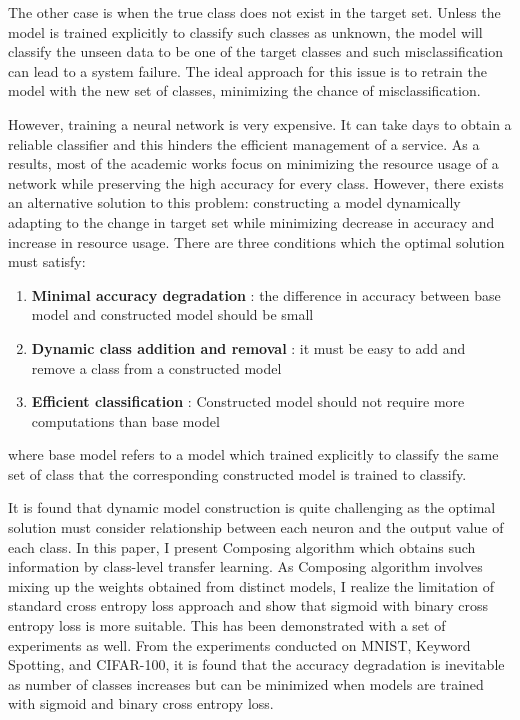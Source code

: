 \documentclass{article}
\begin{document}
The other case is when the true class does not exist in the target set. Unless the model is trained explicitly to classify such classes as unknown, the model will classify the unseen data to be one of the target classes and such misclassification can lead to a system failure. The ideal approach for this issue is to retrain the model with the new set of classes, minimizing the chance of misclassification.

However, training a neural network is very expensive. It can take days to obtain a reliable classifier and this hinders the efficient management of a service. As a results, most of the academic works focus on minimizing the resource usage of a network while preserving the high accuracy for every class. However, there exists an alternative solution to this problem: constructing a model dynamically adapting to the change in target set while minimizing decrease in accuracy and increase in resource usage. There are three conditions which the optimal solution must satisfy:

\begin{enumerate}
    \item \textbf{Minimal accuracy degradation} : the difference in accuracy between base model and constructed model should be small
    \item \textbf{Dynamic class addition and removal} : it must be easy to add and remove a class from a constructed model
    \item \textbf{Efficient classification} : Constructed model should not require more computations than base model
\end{enumerate}

where base model refers to a model which trained explicitly to classify the same set of class that the corresponding constructed model is trained to classify.

It is found that dynamic model construction is quite challenging as the optimal solution must consider relationship between each neuron and the output value of each class. In this paper, I present Composing algorithm which obtains such information by class-level transfer learning. As Composing algorithm involves mixing up the weights obtained from distinct models, I realize the limitation of standard cross entropy loss approach and show that sigmoid with binary cross entropy loss is more suitable. This has been demonstrated with a set of experiments as well. From the experiments conducted on MNIST, Keyword Spotting, and CIFAR-100, it is found that the accuracy degradation is inevitable as number of classes increases but can be minimized when models are trained with sigmoid and binary cross entropy loss.
\end{document}
